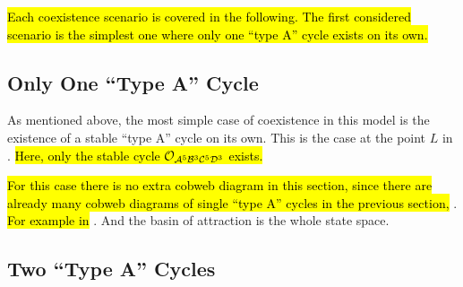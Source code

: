 \hl{
	Each coexistence scenario is covered in the following.
	The first considered scenario is the simplest one where only one ``type A'' cycle exists on its own.
}


\subsection{Only One ``Type A'' Cycle}
\label{sec:arch.coex.A}

As mentioned above, the most simple case of coexistence in this model is the existence of a stable ``type A'' cycle on its own.
This is the case at the point $L$ in .
\hl{
	Here, only the stable cycle $\mathcal{O}_{\mathcal{A}^5\mathcal{B}^3\mathcal{C}^5\mathcal{D}^3}$ exists.
}

\hl{For this case there is no extra cobweb diagram in this section, since there are already many cobweb diagrams of single ``type A'' cycles in the previous section,} .
\hl{For example in} .
And the basin of attraction is the whole state space.

\subsection{Two ``Type A'' Cycles}
\label{sec:arch.coex.AA}

